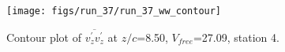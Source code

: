 \begin{figure}[H]
\centering
\texttt{[image: figs/run\_37/run\_37\_ww\_contour]}
\caption{Contour plot of $\overline{v_{z}^{\prime} v_{z}^{\prime}}$ at $z/c$=8.50, $V_{free}$=27.09, station 4.}
\label{fig:run_37_ww_contour}
\end{figure}


